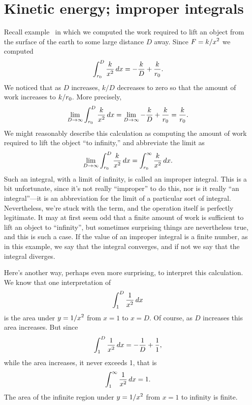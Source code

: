 \section{Kinetic energy; improper integrals}{}{}
\nobreak
Recall example~ in which we computed
the work required to lift an object from the surface of the earth to
some large distance $D$ away. Since $\displaystyle F=k/x^2$ we computed
$$\int_{r_0}^D {k\over x^2}\,dx=-{k\over D}+{k\over r_0}.$$
We noticed that as $D$ increases, $k/D$ decreases to zero so that the
amount of work increases to $\displaystyle k/r_0$. More precisely,
$$
  \lim_{D\to\infty}\int_{r_0}^D {k\over x^2}\,dx= 
  \lim_{D\to\infty}-{k\over D}+{k\over r_0}={k\over r_0}.
$$
We might reasonably describe this calculation as computing the amount
of work required to lift the object ``to infinity,'' and abbreviate
the limit as
$$
  \lim_{D\to\infty}\int_{r_0}^D {k\over x^2}\,dx= \int_{r_0}^\infty
  {k\over x^2}\,dx.
$$ 
Such an integral, with a limit of infinity, is called an {\dfont
improper integral\/}.
This is a bit unfortunate, since it's not really ``improper'' to do
this, nor is it really ``an integral''---it is an abbreviation for the
limit of a particular sort of integral. Nevertheless, we're stuck with
the term, and the operation itself is perfectly legitimate. It may at
first seem odd that a finite amount of work is sufficient to lift an
object to ``infinity'', but sometimes surprising things are
nevertheless true, and this is such a case. If the value of an
improper integral is a finite number, as in this example, we say that
the integral {\dfont converges},
and if not we say that the integral 
{\dfont diverges}.

Here's another way, perhaps even more surprising, to interpret this
calculation. We know that one interpretation of
$$\int_{1}^D {1\over x^2}\,dx$$
is the area under $\displaystyle y=1/x^2$ from $x=1$ to $x=D$. Of course, as $D$
increases this area increases. But since
$$\int_{1}^D {1\over x^2}\,dx=-{1\over D}+{1\over1},$$
while the area increases, it never exceeds 1, that is
$$\int_{1}^\infty {1\over x^2}\,dx= 1.$$
The area of the infinite region under $\displaystyle y=1/x^2$ from $x=1$ to infinity
is finite.

